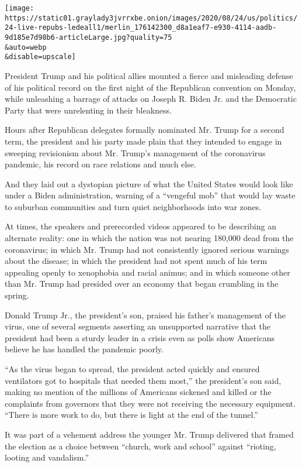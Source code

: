\texttt{[image: https://static01.graylady3jvrrxbe.onion/images/2020/08/24/us/politics/24-live-repubs-ledeall1/merlin\_176142300\_d8a1eaf7-e930-4114-aadb-9d185e7d98b6-articleLarge.jpg?quality=75\\\&auto=webp\\\&disable=upscale]}

President Trump and his political allies mounted a fierce and misleading
defense of his political record on the first night of the Republican
convention on Monday, while unleashing a barrage of attacks on Joseph R.
Biden Jr. and the Democratic Party that were unrelenting in their
bleakness.

Hours after Republican delegates formally nominated Mr. Trump for a
second term, the president and his party made plain that they intended
to engage in sweeping revisionism about Mr. Trump's management of the
coronavirus pandemic, his record on race relations and much else.

And they laid out a dystopian picture of what the United States would
look like under a Biden administration, warning of a ``vengeful mob''
that would lay waste to suburban communities and turn quiet
neighborhoods into war zones.

At times, the speakers and prerecorded videos appeared to be describing
an alternate reality: one in which the nation was not nearing 180,000
dead from the coronavirus; in which Mr. Trump had not consistently
ignored serious warnings about the disease; in which the president had
not spent much of his term appealing openly to xenophobia and racial
animus; and in which someone other than Mr. Trump had presided over an
economy that began crumbling in the spring.

Donald Trump Jr., the president's son, praised his father's management
of the virus, one of several segments asserting an unsupported narrative
that the president had been a sturdy leader in a crisis even as polls
show Americans believe he has handled the pandemic poorly.

``As the virus began to spread, the president acted quickly and ensured
ventilators got to hospitals that needed them most,'' the president's
son said, making no mention of the millions of Americans sickened and
killed or the complaints from governors that they were not receiving the
necessary equipment. ``There is more work to do, but there is light at
the end of the tunnel.''

It was part of a vehement address the younger Mr. Trump delivered that
framed the election as a choice between ``church, work and school''
against ``rioting, looting and vandalism.''

